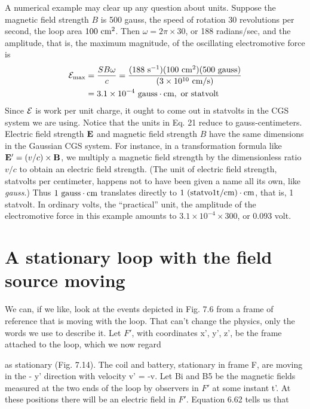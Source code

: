 A numerical example may clear up any question about units.
Suppose the magnetic field strength $B$ is 500 gauss, the speed of rotation
30 revolutions per second, the loop area $100\ \textup{cm}^2$. Then
$\omega = 2\pi \times 30$, or 188 radians/sec, and the amplitude, that is, the
maximum magnitude, of the oscillating electromotive force is
\begin{align}
\begin{split}
  \emf_{\text{max}} &= \frac{SB\omega}{c} 
        = \frac{(188\ \sunit^{-1})(100\ \cmunit^2)(500\ \text{gauss})}{(3\times10^{10}\ \cmunit/\sunit)} \\
        &= 3.1\times10^{-4}\ \text{gauss}\cdot\cmunit,\ \text{or statvolt}
\end{split}
\end{align}
Since $\mathcal{E}$ is work per unit charge, it ought to come out in statvolts in
the CGS system we are using. Notice that the units in Eq. 21 reduce
to gauss-centimeters. Electric field strength $\mathbf{E}$ and magnetic field
strength $B$ have the same dimensions in the Gaussian CGS system.
For instance, in a transformation formula like $\mathbf{E}' = (v/c) \times \mathbf{B}$, we
multiply a magnetic field strength by the dimensionless ratio $v/c$ to
obtain an electric field strength. (The unit of electric field strength,
statvolts per centimeter, happens not to have been given a name all
its own, like \emph{gauss}.) Thus $1\ \textup{gauss}\cdot\textup{cm}$ translates directly to 
$1\ (\text{statvo1t}/\cmunit)\cdot\cmunit$, that is, 1 statvolt. In ordinary volts, the ``practical''
unit, the amplitude of the electromotive force in this example
amounts to $3.1 \times 10^{-4} \times 300$, or 0.093 volt.

\iffalse

\section{A stationary loop with the field source moving}

We can, if we like, look at the events depicted in Fig. 7.6 from a
frame of reference that is moving with the loop. That can't change
the physics, only the words we use to describe it. Let $F'$, with coordinates
x', y', z', be the frame attached to the loop, which we now regard

as stationary (Fig. 7.14). The coil and battery, stationary in frame F,
are moving in the - y' direction with velocity v' = -v. Let Bi and
B5 be the magnetic fields measured at the two ends of the loop by
observers in $F'$ at some instant t'. At these positions there will be
an electric field in $F'$. Equation 6.62 tells us that

